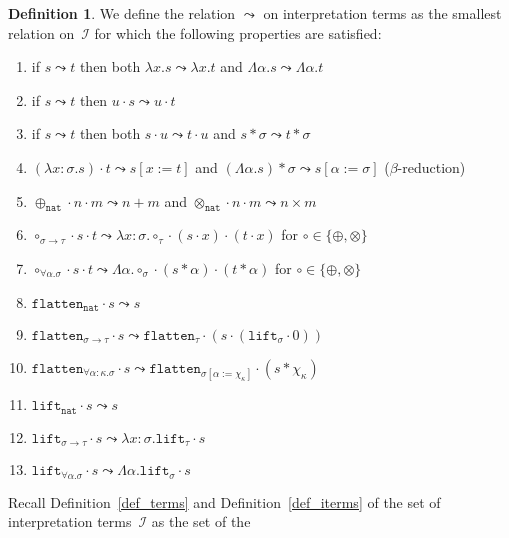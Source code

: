 \documentclass[a4paper,UKenglish,cleveref,autoref,numberwithinsect]{lipics-v2019}
\theoremstyle{definition}
\newtheorem{defn}[theorem]{Definition}
\newcommand{\Iterms}{\mathcal{I}}
\newcommand{\arrtype}{\rightarrow}
\newcommand{\quant}[2]{\forall #1.#2}
\newcommand{\app}[2]{#1 \cdot #2}
\newcommand{\tapp}[2]{#1 * #2}
\newcommand{\subst}[2]{#1:=#2}
\newcommand{\abs}[2]{\lambda #1.#2}
\newcommand{\tabs}[2]{\Lambda #1.#2}
\newcommand{\arrW}{\leadsto}
\newcommand{\nat}{\mathtt{nat}}
\newcommand{\flatten}{\mathtt{flatten}}
\newcommand{\lift}{\mathtt{lift}}
\begin{document}
\begin{defn}
  We define the relation $\arrW$ on interpretation terms as the
  smallest relation on~$\Iterms$ for which the following properties
  are satisfied:
  \begin{enumerate}
  \item\label{arrW:mono:abs}
    if $s \arrW t$ then both $\abs{x}{s} \arrW \abs{x}{t}$ and
    $\tabs{\alpha}{s} \arrW \tabs{\alpha}{t}$
  \item\label{arrW:mono:right}
    if $s \arrW t$ then $\app{u}{s} \arrW \app{u}{t}$
  \item\label{arrW:mono:left}
    if $s \arrW t$ then both $\app{s}{u} \arrW \app{t}{u}$ and
    $\tapp{s}{\sigma} \arrW \tapp{t}{\sigma}$
  \item\label{arrW:beta:abs} $\app{(\abs{x:\sigma}{s})}{t} \arrW
    s[\subst{x}{t}]$
    and
    $\tapp{(\tabs{\alpha}{s})}{\sigma}
    \arrW s[\subst{\alpha}{\sigma}]$
    ($\beta$-reduction)
  \item\label{arrW:plus:base}
    $\app{\app{\oplus_{\nat}}{n}}{m} \arrW n+m$
    and
    $\app{\app{\otimes_{\nat}}{n}}{m}
    \arrW n \times m$
  \item\label{arrW:circ:arrow} $\app{\app{\circ_{\sigma \arrtype
        \tau}}{s}}{t} \arrW
    \abs{x:\sigma}{\app{\app{\circ_\tau}{(\app{s}{x})}}{(\app{t}{x})}}$
    for $\circ \in \{ \oplus, \otimes \}$
  \item\label{arrW:circ:forall}
    $\app{\app{\circ_{\quant{\alpha}{\sigma}}}{s}}{t} \arrW
    \tabs{\alpha}{\app{\app{\circ_\sigma}{(\tapp{s}{\alpha})}}{(
        \tapp{t}{\alpha})}}$ for $\circ \in \{ \oplus, \otimes \}$
  \item $\app{\flatten_\nat}{s} \arrW s$
  \item $\app{\flatten_{\sigma \arrtype \tau}}{s} \arrW
    \app{\flatten_\tau}{(\app{s}{(\app{\lift_\sigma}{0})})}$
  \item $\app{\flatten_{\quant{\alpha:\kappa}{\sigma}}}{s} \arrW
    \app{\flatten_{\sigma[\subst{\alpha}{\chi_\kappa}]}}{(\tapp{s}{\chi_\kappa})}$
  \item $\app{\lift_\nat}{s} \arrW s$
  \item $\app{\lift_{\sigma \arrtype \tau}}{s} \arrW
    \abs{x:\sigma}{\app{\lift_{\tau}}{s}}$
  \item $\app{\lift_{\quant{\alpha}{\sigma}}}{s} \arrW
    \tabs{\alpha}{\app{\lift_{\sigma}}{s}}$
  \end{enumerate}
  Recall Definition~\ref{def_terms} and Definition~\ref{def_iterms} of
  the set of interpretation terms~$\Iterms$ as the set of the

\end{defn}
\end{document}
